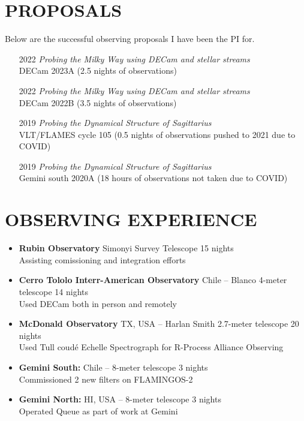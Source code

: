 \documentclass[11pt,letterpaper, sans]{moderncv}        %
\begin{document}
\section{PROPOSALS}
Below are the successful observing proposals I have been the PI for.
\begin{itemize}[itemsep=1pt, leftmargin=28pt]
    \item [2022] \emph{Probing the Milky Way using DECam and stellar streams}\\ DECam 2023A (2.5 nights of observations)
    \item [2022] \emph{Probing the Milky Way using DECam and stellar streams}\\ DECam 2022B (3.5 nights of observations)
    \item [2019] \emph{Probing the Dynamical Structure of Sagittarius}\\ VLT/FLAMES cycle 105 (0.5 nights of observations pushed to 2021 due to COVID)
    \item [2019] \emph{Probing the Dynamical Structure of Sagittarius}\\ Gemini south 2020A (18 hours of observations not taken due to COVID)
\end{itemize}
\section{OBSERVING EXPERIENCE}
\begin{itemize}[itemsep=1pt, leftmargin=2pt]
    \item \textbf{Rubin Observatory} Simonyi Survey Telescope \hfill 15 nights\\
    Assisting comissioning and integration efforts
    \item \textbf{Cerro Tololo Interr-American Observatory} Chile -- Blanco 4-meter telescope \hfill 14 nights\\
           Used DECam both in person and remotely
    \item \textbf{McDonald Observatory} TX, USA -- Harlan Smith 2.7-meter telescope \hfill 20 nights\\
           Used Tull coud\'e Echelle Spectrograph for R-Process Alliance Observing
    \item \textbf{Gemini South:} Chile -- 8-meter telescope \hfill 3 nights\\
           Commissioned 2 new filters on FLAMINGOS-2
    \item \textbf{Gemini North:} HI, USA -- 8-meter telescope \hfill 3 nights\\
           Operated Queue as part of work at Gemini
\end{itemize}
\end{document}

